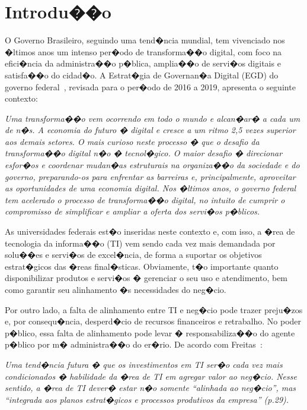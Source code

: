\chapter{Introdu��o}
\label{cap:introducao}

O Governo Brasileiro, seguindo uma tend�ncia mundial, tem vivenciado nos �ltimos anos um intenso per�odo de transforma��o digital, com foco na efici�ncia da administra��o p�blica, amplia��o de servi�os digitais e satisfa��o do cidad�o. A Estrat�gia de Governan�a Digital (EGD) do governo federal~\cite{EGD2018}, revisada para o per�odo de 2016 a 2019, apresenta o seguinte contexto:

\begin{citacao}
  \textit{Uma transforma��o vem ocorrendo em todo o mundo e alcan�ar� a cada um de n�s. A economia do futuro � digital e cresce a um ritmo 2,5 vezes superior aos demais setores.
O mais curioso neste processo � que o desafio da transforma��o digital n�o � tecnol�gico. O maior desafio � direcionar esfor�os e coordenar mudan�as estruturais na organiza��o da sociedade e do governo, preparando-os para enfrentar as barreiras e, principalmente, aproveitar as oportunidades de uma economia digital.
Nos �ltimos anos, o governo federal tem acelerado o processo de transforma��o digital, no intuito de cumprir o compromisso de simplificar e ampliar a oferta dos servi�os p�blicos.}
\end{citacao}

As universidades federais est�o inseridas neste contexto e, com isso, a �rea de tecnologia da informa��o (TI) vem sendo cada vez mais demandada por solu��es e servi�os de excel�ncia, de forma a suportar os objetivos estrat�gicos das �reas final�sticas. Obviamente, t�o importante quanto disponibilizar produtos e servi�os � gerenciar o seu uso e atendimento, bem como garantir seu alinhamento �s necessidades do neg�cio.

Por outro lado, a falta de alinhamento entre TI e neg�cio pode trazer preju�zos e, por consequ�ncia, desperd�cio de recursos financeiros e retrabalho. No poder p�blico, essa falta de alinhamento pode levar � responsabiliza��o do agente p�blico por m� administra��o do er�rio. De acordo com Freitas~\cite{Freitas2013}:

\begin{citacao}
  \textit{Uma tend�ncia futura � que os investimentos em TI ser�o cada vez mais condicionados � habilidade da �rea de TI em agregar valor ao neg�cio. Nesse sentido, a �rea de TI dever� estar n�o somente ``alinhada ao neg�cio'', mas ``integrada aos planos estrat�gicos e processos produtivos da empresa'' (p.29).}
\end{citacao}

